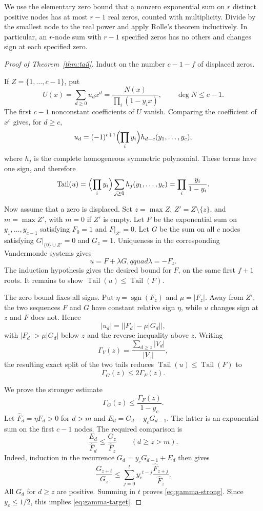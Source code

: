 \documentclass[11pt]{article}
\theoremstyle{definition}
\theoremstyle{remark}
\newcommand{\Tail}{\operatorname{Tail}}
\newcommand{\sgn}{\operatorname{sgn}}
\begin{document}
We use the elementary zero bound that a nonzero exponential sum on $r$
distinct positive nodes has at most $r-1$ real zeros, counted with
multiplicity.  Divide by the smallest node to the real power and apply
Rolle's theorem inductively.  In particular, an $r$-node sum with $r-1$
specified zeros has no others and changes sign at each specified zero.

\begin{proof}[Proof of Theorem~\ref{thm:tail}]
Induct on the number $c-1-f$ of displaced zeros.

If $Z=\{1,\ldots,c-1\}$, put
\[
  U(x)=\sum_{d\ge0}u_dx^d
      =\frac{N(x)}{\prod_i(1-y_ix)},
  \qquad \deg N\le c-1.
\]
The first $c-1$ nonconstant coefficients of $U$ vanish.  Comparing the
coefficient of $x^c$ gives, for $d\ge c$,
\[
  u_d=(-1)^{c+1}\Bigl(\prod_i y_i\Bigr)h_{d-c}(y_1,\ldots,y_c),
\]
where $h_j$ is the complete homogeneous symmetric polynomial.  These terms
have one sign, and therefore
\[
  \Tail(u)=\Bigl(\prod_i y_i\Bigr)
            \sum_{j\ge0}h_j(y_1,\ldots,y_c)
          =\prod_i\frac{y_i}{1-y_i}.
\]

Now assume that a zero is displaced.  Set $z=\max Z$,
$Z'=Z\setminus\{z\}$, and $m=\max Z'$, with $m=0$ if $Z'$ is empty.  Let
$F$ be the exponential sum on $y_1,\ldots,y_{c-1}$ satisfying
$F_0=1$ and $F|_{Z'}=0$.  Let $G$ be the sum on all $c$ nodes satisfying
$G|_{\{0\}\cup Z'}=0$ and $G_z=1$.  Uniqueness in the corresponding
Vandermonde systems gives
\[
  u=F+\lambda G,qquad \lambda=-F_z.
\]
The induction hypothesis gives the desired bound for $F$, on the same first
$f+1$ roots.  It remains to show $\Tail(u)\le\Tail(F)$.

The zero bound fixes all signs.  Put $\eta=\sgn(F_z)$ and
$\mu=|F_z|$.  Away from $Z'$, the two sequences $F$ and $G$ have constant
relative sign $\eta$, while $u$ changes sign at $z$ and $F$ does not.  Hence
\[
 |u_d|=\bigl||F_d|-\mu|G_d|\bigr|,
\]
with $|F_d|>\mu|G_d|$ below $z$ and the reverse inequality above $z$.
Writing
\[
  \Gamma_V(z)=\frac{\sum_{d\ge z}|V_d|}{|V_z|},
\]
the resulting exact split of the two tails reduces
$\Tail(u)\le\Tail(F)$ to
\begin{equation}\label{eq:gamma-target}
  \Gamma_G(z)\le2\Gamma_F(z).
\end{equation}

We prove the stronger estimate
\begin{equation}\label{eq:gamma-strong}
  \Gamma_G(z)\le\frac{\Gamma_F(z)}{1-y_c}.
\end{equation}
Let $\widehat F_d=\eta F_d>0$ for $d>m$ and
$E_d=G_d-y_cG_{d-1}$.  The latter is an exponential sum on the first
$c-1$ nodes.  The required comparison is
\begin{equation}\label{eq:drive}
  \frac{E_d}{\widehat F_d}
  \le\frac{G_z}{\widehat F_z}
  \qquad(d\ge z>m).
\end{equation}
Indeed, induction in the recurrence $G_d=y_cG_{d-1}+E_d$ then gives
\[
  \frac{G_{z+t}}{G_z}
  \le\sum_{j=0}^{t}y_c^{,t-j}
       \frac{\widehat F_{z+j}}{\widehat F_z}.
\]
All $G_d$ for $d\ge z$ are positive.  Summing in $t$ proves
\eqref{eq:gamma-strong}.  Since $y_c\le1/2$, this implies
\eqref{eq:gamma-target}.


\end{proof}
\end{document}
